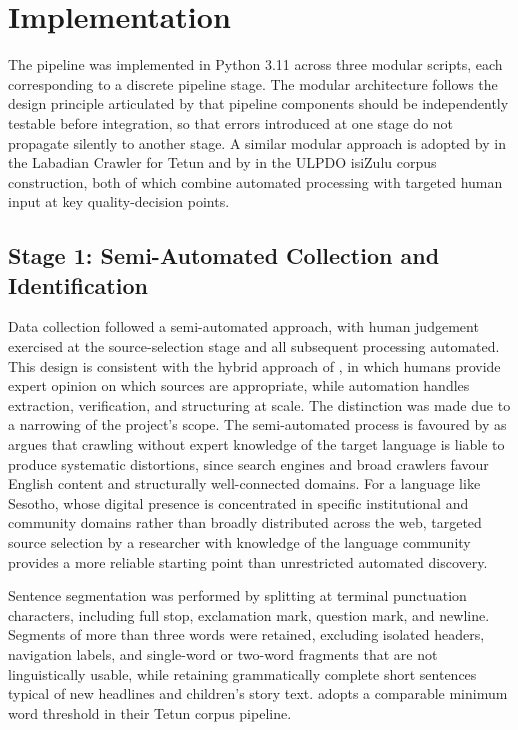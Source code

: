\documentclass[11pt,a4paper]{article}
\begin{document}
\section{Implementation}
The pipeline was implemented in Python 3.11 across three modular scripts, each corresponding to a discrete pipeline stage. The modular architecture follows the design principle articulated by \citet{suchomel2020better} that pipeline components should be independently testable before integration, so that errors introduced at one stage do not propagate silently to another stage. A similar modular approach is adopted by \citet{de2024data} in the Labadian Crawler for Tetun and by \citet{gumede2025creating} in the ULPDO isiZulu corpus construction, both of which combine automated processing with targeted human input at key quality-decision points.

\subsection{Stage 1: Semi-Automated Collection and Identification}
\label{sec:semi-automated}
Data collection followed a semi-automated approach, with human judgement exercised at the source-selection stage and all subsequent processing automated. This design is consistent with the hybrid approach of \citet{gumede2025creating}, in which humans provide expert opinion on which sources are appropriate, while automation handles extraction, verification, and structuring at scale. The distinction was made due to a narrowing of the project's scope. The semi-automated process is favoured by \citet{barbaresi2013challenges} as \citet{barbaresi2013challenges} argues that crawling without expert knowledge of the target language is liable to produce systematic distortions, since search engines and broad crawlers favour English content and structurally well-connected domains. For a language like Sesotho, whose digital presence is concentrated in specific institutional and community domains rather than broadly distributed across the web, targeted source selection by a researcher with knowledge of the language community provides a more reliable starting point than unrestricted automated discovery.

Sentence segmentation was performed by splitting at terminal punctuation characters, including full stop, exclamation mark, question mark, and newline. Segments of more than three words were retained, excluding isolated headers, navigation labels, and single-word or two-word fragments that are not linguistically usable, while retaining grammatically complete short sentences typical of new headlines and children's story text. \citep{de2024data} adopts a comparable minimum word threshold in their Tetun corpus pipeline.
\end{document}
